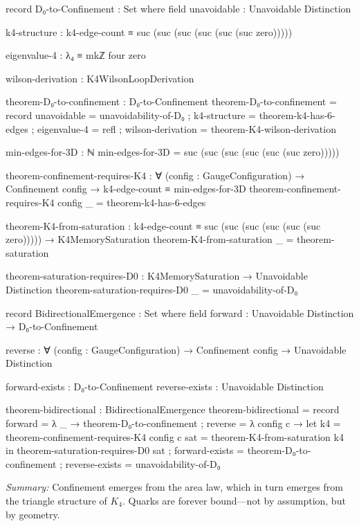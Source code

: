 \documentclass[11pt,a4paper]{book}
\begin{document}
\begin{code}
record D₀-to-Confinement : Set where
  field
    unavoidable : Unavoidable Distinction
    
    k4-structure : k4-edge-count ≡ suc (suc (suc (suc (suc (suc zero)))))
    
    eigenvalue-4 : λ₄ ≡ mkℤ four zero
    
    wilson-derivation : K4WilsonLoopDerivation

theorem-D₀-to-confinement : D₀-to-Confinement
theorem-D₀-to-confinement = record
  { unavoidable  = unavoidability-of-D₀
  ; k4-structure = theorem-k4-has-6-edges
  ; eigenvalue-4 = refl
  ; wilson-derivation = theorem-K4-wilson-derivation
  }

min-edges-for-3D : ℕ
min-edges-for-3D = suc (suc (suc (suc (suc (suc zero)))))

theorem-confinement-requires-K4 : ∀ (config : GaugeConfiguration) →
  Confinement config → 
  k4-edge-count ≡ min-edges-for-3D
theorem-confinement-requires-K4 config _ = theorem-k4-has-6-edges

theorem-K4-from-saturation : 
  k4-edge-count ≡ suc (suc (suc (suc (suc (suc zero))))) →
  K4MemorySaturation
theorem-K4-from-saturation _ = theorem-saturation

theorem-saturation-requires-D0 : K4MemorySaturation → Unavoidable Distinction
theorem-saturation-requires-D0 _ = unavoidability-of-D₀

record BidirectionalEmergence : Set where
  field
    forward : Unavoidable Distinction → D₀-to-Confinement
    
    reverse : ∀ (config : GaugeConfiguration) → 
              Confinement config → Unavoidable Distinction
    
    forward-exists : D₀-to-Confinement
    reverse-exists : Unavoidable Distinction

theorem-bidirectional : BidirectionalEmergence
theorem-bidirectional = record
  { forward   = λ _ → theorem-D₀-to-confinement
  ; reverse   = λ config c → 
      let k4 = theorem-confinement-requires-K4 config c
          sat = theorem-K4-from-saturation k4
      in theorem-saturation-requires-D0 sat
  ; forward-exists = theorem-D₀-to-confinement
  ; reverse-exists = unavoidability-of-D₀
  }
\end{code}

\medskip
\noindent\textit{Summary:} Confinement emerges from the area law, which in turn emerges from 
the triangle structure of $K_4$. Quarks are forever bound—not by assumption, but by geometry.
\end{document}

